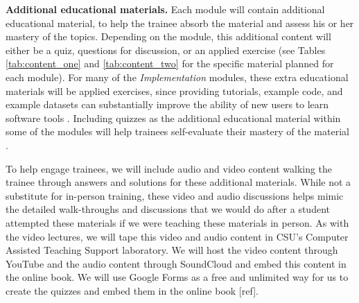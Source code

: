 \documentclass[pdftex,english,11pt,parskip=half]{scrartcl}
\begin{document}
\textbf{Additional educational materials.} Each module will contain additional
educational material, to help the trainee absorb the material and assess his or
her mastery of the topics. Depending on the module, this additional content will
either be a quiz, questions for discussion, or an applied exercise (see Tables
\ref{tab:content_one} and \ref{tab:content_two} for the specific material
planned for each module). For many of the \textit{Implementation} modules, these extra educational materials will be applied exercises, since providing tutorials, example code, and example datasets can substantially improve the ability of new users to learn software tools \cite{list2017ten, searls2012ten, via2011ten}. Including quizzes as the additional educational material within some of the modules will help trainees self-evaluate their mastery of the material \cite{searls2012ten, via2011ten}. 

To help engage trainees, we will include audio and
video content walking the trainee through answers and solutions for these
additional materials. While not a substitute for in-person training, these video
and audio discussions helps mimic the detailed
walk-throughs and discussions that we would do after a student attempted these
materials if we were teaching these materials in person. As with the video lectures, we will tape this video
and audio content in CSU's Computer Assisted Teaching Support laboratory. We will host the video content through YouTube and the
audio content through SoundCloud and embed this content in the online book. We will use Google Forms as a free and unlimited way
for us to create the quizzes and embed them in the online book [ref].
\end{document}
